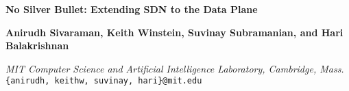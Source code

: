 \documentclass[csaild4,portrait]{xa0poster}
\title{}
\author{}
\affiliation{}
\begin{document}
\def\secheadcol{blue}
\def\rightlogoscale{0.8}
\maketitle
\vspace{-7.9in} %
\begin{centering}
{\LARGE \bf{No Silver Bullet: Extending SDN to the Data Plane}
}

\vspace{\baselineskip}

{\LARGE \bf {Anirudh Sivaraman, Keith Winstein, Suvinay Subramanian, and Hari Balakrishnan}}

{\LARGE \textit {MIT Computer Science and Artificial Intelligence Laboratory, Cambridge, Mass.}}\\
{\LARGE \texttt {\{anirudh, keithw, suvinay, hari\}@mit.edu}}

\end{centering}

\vspace{\baselineskip}




\end{document}
